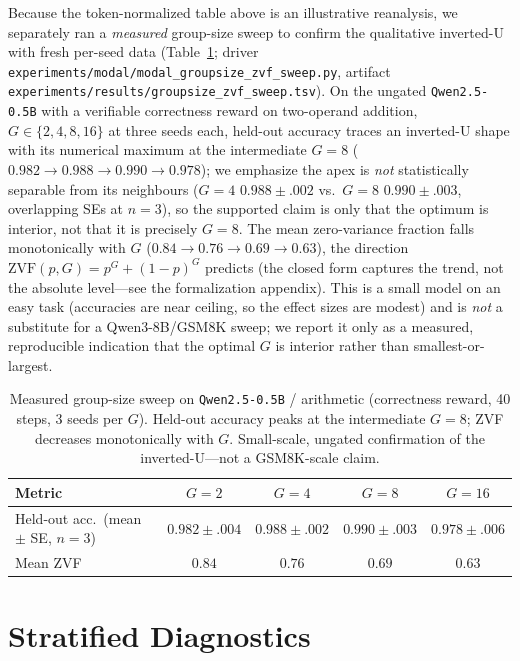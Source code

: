 \documentclass{article}
\begin{document}
Because the token-normalized table above is an illustrative reanalysis, we
separately ran a \emph{measured} group-size sweep to confirm the qualitative
inverted-U with fresh per-seed data (Table~\ref{tab:groupsize-measured};
driver \texttt{experiments/modal/modal\_groupsize\_zvf\_sweep.py}, artifact
\texttt{experiments/results/groupsize\_zvf\_sweep.tsv}). On the ungated
\texttt{Qwen2.5-0.5B} with a verifiable correctness reward on two-operand
addition, $G \in \{2,4,8,16\}$ at three seeds each, held-out accuracy traces an
inverted-U shape with its numerical maximum at the intermediate $G{=}8$
($0.982 \to 0.988 \to 0.990 \to 0.978$); we emphasize the apex is \emph{not}
statistically separable from its neighbours ($G{=}4$ $0.988{\pm}.002$ vs.\
$G{=}8$ $0.990{\pm}.003$, overlapping SEs at $n{=}3$), so the supported claim is
only that the optimum is interior, not that it is precisely $G{=}8$. The mean
zero-variance fraction falls monotonically with $G$ ($0.84 \to 0.76 \to 0.69 \to
0.63$), the direction $\mathrm{ZVF}(p,G)=p^{G}+(1-p)^{G}$ predicts (the closed
form captures the trend, not the absolute level---see the formalization
appendix). This is a small model on an easy task (accuracies are near ceiling,
so the effect sizes are modest) and is \emph{not} a substitute for a
Qwen3-8B/GSM8K sweep; we report it only as a measured, reproducible indication
that the optimal $G$ is interior rather than smallest-or-largest.

\begin{table}[ht]
\centering
\small
\begin{tabular}{lcccc}
\toprule
Metric & $G{=}2$ & $G{=}4$ & $G{=}8$ & $G{=}16$ \\
\midrule
Held-out acc.\ (mean $\pm$ SE, $n{=}3$) & $0.982{\pm}.004$ & $0.988{\pm}.002$ & $\mathbf{0.990}{\pm}.003$ & $0.978{\pm}.006$ \\
Mean ZVF & $0.84$ & $0.76$ & $0.69$ & $0.63$ \\
\bottomrule
\end{tabular}
\caption{Measured group-size sweep on \texttt{Qwen2.5-0.5B} / arithmetic
(correctness reward, 40 steps, 3 seeds per $G$). Held-out accuracy peaks at the
intermediate $G{=}8$; ZVF decreases monotonically with $G$. Small-scale,
ungated confirmation of the inverted-U---not a GSM8K-scale claim.}
\label{tab:groupsize-measured}
\end{table}
 
\section*{Stratified Diagnostics}
\label{sec:stratified-diagnostics}
\end{document}
